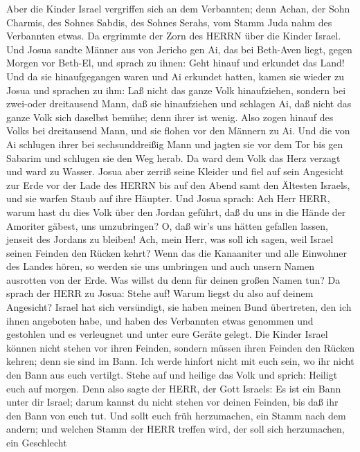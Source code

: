  Aber die Kinder Israel vergriffen sich an dem Verbannten;
denn Achan, der Sohn Charmis, des Sohnes Sabdis, des Sohnes Serahs, vom
Stamm Juda nahm des Verbannten etwas. Da ergrimmte der Zorn des HERRN
über die Kinder Israel.  Und Josua sandte Männer aus von
Jericho gen Ai, das bei Beth-Aven liegt, gegen Morgen vor Beth-El, und
sprach zu ihnen: Geht hinauf und erkundet das Land! Und da sie
hinaufgegangen waren und Ai erkundet hatten,  kamen sie
wieder zu Josua und sprachen zu ihm: Laß nicht das ganze Volk
hinaufziehen, sondern bei zwei-oder dreitausend Mann, daß sie
hinaufziehen und schlagen Ai, daß nicht das ganze Volk sich daselbst
bemühe; denn ihrer ist wenig.  Also zogen hinauf des Volks
bei dreitausend Mann, und sie flohen vor den Männern zu Ai. 
Und die von Ai schlugen ihrer bei sechsunddreißig Mann und jagten sie
vor dem Tor bis gen Sabarim und schlugen sie den Weg herab. Da ward dem
Volk das Herz verzagt und ward zu Wasser.  Josua aber zerriß
seine Kleider und fiel auf sein Angesicht zur Erde vor der Lade des
HERRN bis auf den Abend samt den Ältesten Israels, und sie warfen Staub
auf ihre Häupter.  Und Josua sprach: Ach Herr HERR, warum
hast du dies Volk über den Jordan geführt, daß du uns in die Hände der
Amoriter gäbest, uns umzubringen? O, daß wir's uns hätten gefallen
lassen, jenseit des Jordans zu bleiben!  Ach, mein Herr, was
soll ich sagen, weil Israel seinen Feinden den Rücken kehrt?
 Wenn das die Kanaaniter und alle Einwohner des Landes
hören, so werden sie uns umbringen und auch unsern Namen ausrotten von
der Erde. Was willst du denn für deinen großen Namen tun? 
Da sprach der HERR zu Josua: Stehe auf! Warum liegst du also auf deinem
Angesicht?  Israel hat sich versündigt, sie haben meinen
Bund übertreten, den ich ihnen angeboten habe, und haben des Verbannten
etwas genommen und gestohlen und es verleugnet und unter eure Geräte
gelegt.  Die Kinder Israel können nicht stehen vor ihren
Feinden, sondern müssen ihren Feinden den Rücken kehren; denn sie sind
im Bann. Ich werde hinfort nicht mit euch sein, wo ihr nicht den Bann
aus euch vertilgt.  Stehe auf und heilige das Volk und
sprich: Heiligt euch auf morgen. Denn also sagte der HERR, der Gott
Israels: Es ist ein Bann unter dir Israel; darum kannst du nicht stehen
vor deinen Feinden, bis daß ihr den Bann von euch tut.  Und
sollt euch früh herzumachen, ein Stamm nach dem andern; und welchen
Stamm der HERR treffen wird, der soll sich herzumachen, ein Geschlecht
